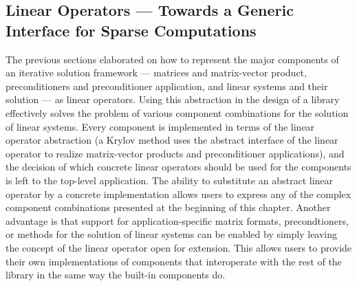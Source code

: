 \subsection{Linear Operators --- Towards a Generic Interface for Sparse
            Computations}
The previous sections elaborated on how to represent the major components of an
iterative solution framework --- matrices and matrix-vector product,
preconditioners and preconditioner application, and linear systems and their
solution --- as linear operators. Using this abstraction in the design of a
library effectively solves the problem of various component combinations for the
solution of linear systems.  Every component is implemented in terms of the
linear operator abstraction (\eg a Krylov method uses the abstract interface of
the linear operator to realize matrix-vector products and preconditioner
applications), and the decision of which concrete linear operators should be
used for the components is left to the top-level application. The ability to
substitute an abstract linear operator by a concrete implementation allows
users to express any of the complex component combinations presented at the
beginning of this chapter. Another advantage is that support for
application-specific matrix formats, precondtioners, or methods for the solution
of linear systems can be enabled by simply leaving the concept of the linear
operator open for extension. This allows users to provide their own
implementations of components that interoperate with the rest of the library in
the same way the built-in components do.


